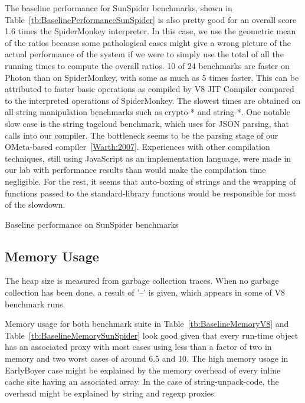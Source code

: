 The baseline performance for SunSpider benchmarks, shown in
Table~\ref{tb:BaselinePerformanceSunSpider} is also pretty good for an overall
score 1.6 times the SpiderMonkey interpreter. In this case, we use the
geometric mean of the ratios because some pathological cases might give a wrong
picture of the actual performance of the system if we were to simply use the
total of all the running times to compute the overall ratios.  10 of 24
benchmarks are faster on Photon than on SpiderMonkey, with some as much as 5
times faster. This can be attributed to faster basic operations as compiled by
V8 JIT Compiler compared to the interpreted operations of SpiderMonkey. The
slowest times are obtained on all string manipulation benchmarks such as
crypto-* and string-*. One notable slow case is the string tagcloud benchmark,
which uses  for JSON parsing, that calls into our compiler.  The
bottleneck seems to be the parsing stage of our OMeta-based compiler~\ref{Warth:2007}.
Experiences with other compilation techniques, still using JavaScript as an
implementation language, were made in our lab with performance results than
would make the compilation time negligible. For the rest, it seems that
auto-boxing of strings and the wrapping of functions passed to the
standard-library functions would be responsible for most of the slowdown.


\begin{table}[htb]
\caption{Baseline performance on SunSpider benchmarks}
\centering
    
\label{tb:BaselinePerformanceSunSpider}
\end{table}

\subsection{Memory Usage}
The heap size is measured from garbage collection traces. When no garbage
collection has been done, a result of '--' is given, which appears in some of V8
benchmark runs.

Memory usage for both benchmark suite in Table~\ref{tb:BaselineMemoryV8} and
Table~\ref{tb:BaselineMemorySunSpider} look good given that every run-time
object has an associated proxy with most cases using less than a factor of two
in memory and two worst cases of around 6.5 and 10. The high memory usage in
EarlyBoyer case might be explained by the memory overhead of every inline cache
site having an associated array. In the case of string-unpack-code, the
overhead might be explained by string and regexp proxies.

